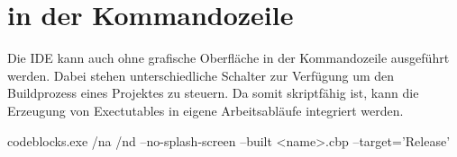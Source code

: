 
\section{\codeblocks in der Kommandozeile}

Die IDE \codeblocks kann auch ohne grafische Oberfläche in der Kommandozeile ausgeführt werden. Dabei stehen unterschiedliche Schalter zur Verfügung um den Buildprozess eines Projektes zu steuern. Da \codeblocks somit skriptfähig ist, kann die Erzeugung von Exectutables in eigene Arbeitsabläufe integriert werden.

\begin{cmd}
codeblocks.exe /na /nd --no-splash-screen --built <name>.cbp --target='Release'
\end{cmd}

